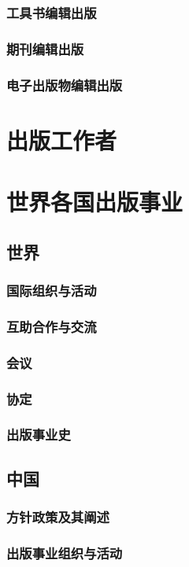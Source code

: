 \documentclass[UTF8]{../../ApplicationUniverse}
\begin{document}
    \subsubsection{工具书编辑出版}
    \subsubsection{期刊编辑出版}
    \subsubsection{电子出版物编辑出版}

\section{出版工作者}
\section{世界各国出版事业}
    \subsection{世界}
        \subsubsection{国际组织与活动}
        \subsubsection{互助合作与交流}
        \subsubsection{会议}
        \subsubsection{协定}
        \subsubsection{出版事业史}
    \subsection{中国}
        \subsubsection{方针政策及其阐述}
        \subsubsection{出版事业组织与活动}
\end{document}
